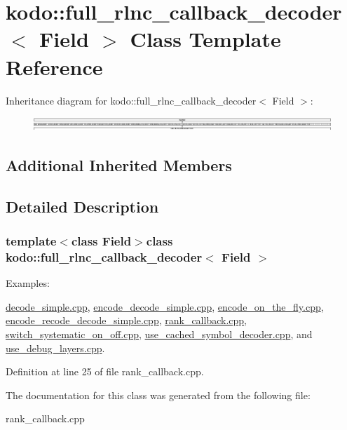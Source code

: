 \hypertarget{classkodo_1_1full__rlnc__callback__decoder}{\section{kodo\-:\-:full\-\_\-rlnc\-\_\-callback\-\_\-decoder$<$ Field $>$ Class Template Reference}
\label{classkodo_1_1full__rlnc__callback__decoder}
}
Inheritance diagram for kodo\-:\-:full\-\_\-rlnc\-\_\-callback\-\_\-decoder$<$ Field $>$\-:\begin{figure}[H]
\begin{center}
\leavevmode
\includegraphics[height=0.524181cm]{classkodo_1_1full__rlnc__callback__decoder}
\end{center}
\end{figure}
\subsection*{Additional Inherited Members}


\subsection{Detailed Description}
\subsubsection*{template$<$class Field$>$class kodo\-::full\-\_\-rlnc\-\_\-callback\-\_\-decoder$<$ Field $>$}

\begin{Desc}
\item[Examples\-: ]\par
\hyperlink{decode_simple_8cpp-example}{decode\-\_\-simple.\-cpp}, \hyperlink{encode_decode_simple_8cpp-example}{encode\-\_\-decode\-\_\-simple.\-cpp}, \hyperlink{encode_on_the_fly_8cpp-example}{encode\-\_\-on\-\_\-the\-\_\-fly.\-cpp}, \hyperlink{encode_recode_decode_simple_8cpp-example}{encode\-\_\-recode\-\_\-decode\-\_\-simple.\-cpp}, \hyperlink{rank_callback_8cpp-example}{rank\-\_\-callback.\-cpp}, \hyperlink{switch_systematic_on_off_8cpp-example}{switch\-\_\-systematic\-\_\-on\-\_\-off.\-cpp}, \hyperlink{use_cached_symbol_decoder_8cpp-example}{use\-\_\-cached\-\_\-symbol\-\_\-decoder.\-cpp}, and \hyperlink{use_debug_layers_8cpp-example}{use\-\_\-debug\-\_\-layers.\-cpp}.\end{Desc}


Definition at line 25 of file rank\-\_\-callback.\-cpp.



The documentation for this class was generated from the following file\-:\begin{DoxyCompactItemize}
\item 
rank\-\_\-callback.\-cpp\end{DoxyCompactItemize}
